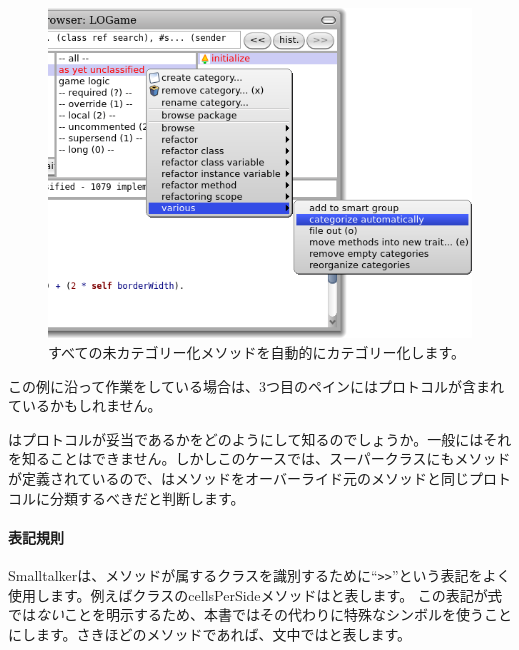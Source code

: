 \documentclass[a4paper,10pt,twoside]{book}
\begin{document}
\begin{figure}[htbp]
   \centering
   \includegraphics[width=\textwidth]{Categorize} 
   \caption{すべての未カテゴリー化メソッドを自動的にカテゴリー化します。}
\end{figure}

この例に沿って作業をしている場合は、3つ目のペインにはプロトコルが含まれているかもしれません。


\pharo はプロトコルが妥当であるかをどのようにして知るのでしょうか。一般に\pharo はそれを知ることはできません。しかしこのケースでは、スーパークラスにもメソッドが定義されているので、\pharo はメソッドをオーバーライド元のメソッドと同じプロトコルに分類するべきだと判断します。



\paragraph{表記規則} Smalltalkerは、メソッドが属するクラスを識別するために``\verb|>>|''という表記をよく使用します。例えばクラスのcellsPerSideメソッドはと表します。
この表記が\st 式では\emph{ない}ことを明示するため、本書ではその代わりに特殊なシンボル\ct{>>>}を使うことにします。さきほどのメソッドであれば、文中ではと表します。
\end{document}
